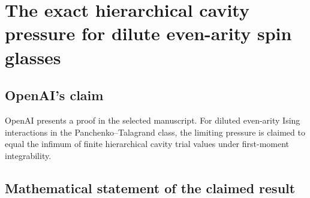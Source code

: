 \documentclass[11pt]{article}
\begin{document}
\section*{The exact hierarchical cavity pressure for dilute even-arity spin glasses}

\subsection{OpenAI's claim}
OpenAI presents a proof in the selected manuscript. For diluted even-arity Ising interactions in the Panchenko--Talagrand class, the limiting pressure is claimed to equal the infimum of finite hierarchical cavity trial values under first-moment integrability.

\subsection{Mathematical statement of the claimed result}
\end{document}
